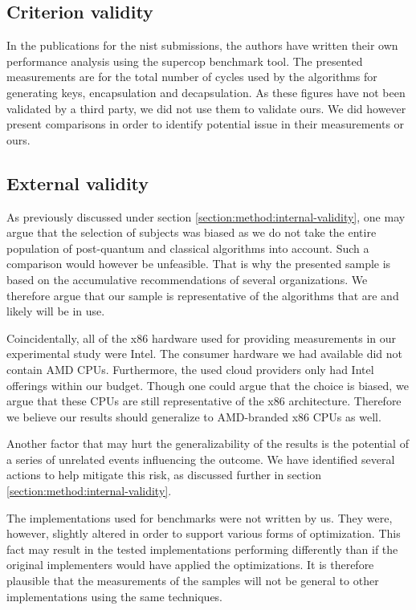 \subsection{Criterion validity}

In the publications for the \gls{nist} submissions, the authors have written their own performance analysis using the \gls{supercop} benchmark tool. The presented measurements are for the total number of cycles used by the algorithms for generating keys, encapsulation and decapsulation. As these figures have not been validated by a third party, we did not use them to validate ours. We did however present comparisons in order to identify potential issue in their measurements or ours.

\subsection{External validity}

As previously discussed under section \ref{section:method:internal-validity}, one may argue that the selection of subjects was biased as we do not take the entire population of \gls{post-quantum} and classical algorithms into account. Such a comparison would however be unfeasible. That is why the presented sample is based on the accumulative recommendations of several organizations. We therefore argue that our sample is representative of the algorithms that are and likely will be in use.

Coincidentally, all of the \gls{x86} hardware used for providing measurements in our experimental study were Intel. The consumer hardware we had available did not contain AMD CPUs. Furthermore, the used cloud providers only had Intel offerings within our budget. Though one could argue that the choice is biased, we argue that these CPUs are still representative of the \gls{x86} architecture. Therefore we believe our results should generalize to AMD-branded \gls{x86} CPUs as well.

Another factor that may hurt the generalizability of the results is the potential of a series of unrelated events influencing the outcome. We have identified several actions to help mitigate this risk, as discussed further in section \ref{section:method:internal-validity}.

The implementations used for benchmarks were not written by us. They were, however, slightly altered in order to support various forms of optimization. This fact may result in the tested implementations performing differently than if the original implementers would have applied the optimizations. It is therefore plausible that the measurements of the samples will not be general to other implementations using the same techniques.

